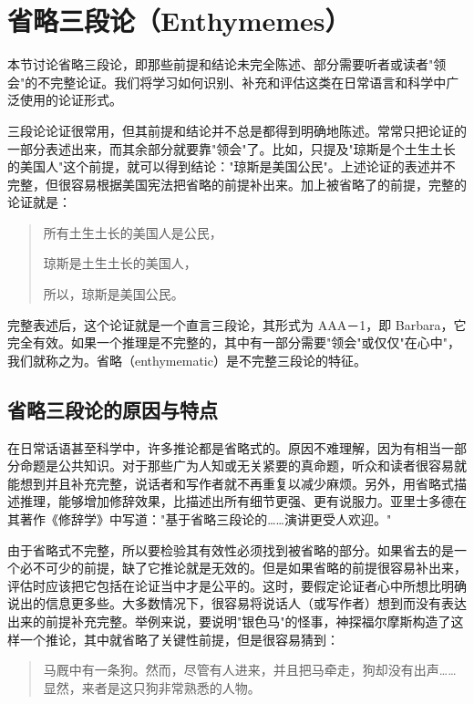 \section{省略三段论（Enthymemes）}

\begin{logicbox}[title=引言]
本节讨论省略三段论，即那些前提和结论未完全陈述、部分需要听者或读者"领会"的不完整论证。我们将学习如何识别、补充和评估这类在日常语言和科学中广泛使用的论证形式。
\end{logicbox}

三段论论证很常用，但其前提和结论并不总是都得到明确地陈述。常常只把论证的一部分表述出来，而其余部分就要靠"领会"了。比如，只提及"琼斯是个土生土长的美国人"这个前提，就可以得到结论："琼斯是美国公民"。上述论证的表述并不完整，但很容易根据美国宪法把省略的前提补出来。加上被省略了的前提，完整的论证就是：

\begin{quote}
所有土生土长的美国人是公民，

琼斯是土生土长的美国人，

所以，琼斯是美国公民。
\end{quote}

完整表述后，这个论证就是一个直言三段论，其形式为 AAA－1，即 Barbara，它完全有效。如果一个推理是不完整的，其中有一部分需要"领会"或仅仅"在心中"，我们就称之为。省略（enthymematic）是不完整三段论的特征。

\subsection{省略三段论的原因与特点}

在日常话语甚至科学中，许多推论都是省略式的。原因不难理解，因为有相当一部分命题是公共知识。对于那些广为人知或无关紧要的真命题，听众和读者很容易就能想到并且补充完整，说话者和写作者就不再重复以减少麻烦。另外，用省略式描述推理，能够增加修辞效果，比描述出所有细节更强、更有说服力。亚里士多德在其著作《修辞学》中写道："基于省略三段论的……演讲更受人欢迎。"

由于省略式不完整，所以要检验其有效性必须找到被省略的部分。如果省去的是一个必不可少的前提，缺了它推论就是无效的。但是如果省略的前提很容易补出来，评估时应该把它包括在论证当中才是公平的。这时，要假定论证者心中所想比明确说出的信息更多些。大多数情况下，很容易将说话人（或写作者）想到而没有表达出来的前提补充完整。举例来说，要说明"银色马"的怪事，神探福尔摩斯构造了这样一个推论，其中就省略了关键性前提，但是很容易猜到：

\begin{quote}
马厩中有一条狗。然而，尽管有人进来，并且把马牵走，狗却没有出声……显然，来者是这只狗非常熟悉的人物。
\end{quote}

